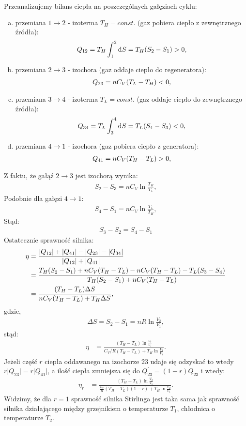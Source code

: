 \documentclass[11pt,a4paper]{article}
\begin{document}
Przeanalizujemy bilans ciepła na poszczególnych gałęziach cyklu:
\begin{enumerate}[a)]
\item przemiana $1 \rightarrow 2$ - izoterma $T_H =const.$  (gaz pobiera ciepło z zewnętrznego źródła):
\begin{align}
Q_{\rm 12} =T_H \int_1^2 {\rm d} S = T_H (S_2-S_1)>0,
\end{align}
\item przemiana $2 \rightarrow 3$ - izochora (gaz oddaje ciepło do regeneratora):
\begin{align}
Q_{\rm 23} =n C_V (T_L -T_H)<0,
\end{align}
\item przemiana $3 \rightarrow 4$ - izoterma $T_L=const.$  (gaz oddaje ciepło do zewnętrznego źródła):
\begin{align}
Q_{\rm 34} =T_L \int_3^4 {\rm d} S = T_L (S_4-S_3)<0,
\end{align}
\item przemiana $4 \rightarrow 1$ - izochora (gaz pobiera ciepło z generatora):
\begin{align}
Q_{\rm 41} =n C_V (T_H -T_L)>0,
\end{align}
\end{enumerate}
Z faktu, że gałąź $2\rightarrow 3$ jest izochorą wynika:
\begin{align}
S_2-S_3 = n C_V \ln{\frac{T_H}{T_L}},
\end{align}
Podobnie dla gałęzi $4 \rightarrow 1$:
\begin{align}
S_4-S_1 = n C_V \ln{\frac{T_L}{T_H}},
\end{align}
Stąd:
\begin{align}
S_3-S_2= S_4-S_1 
\end{align}
Ostatecznie sprawność silnika:
\begin{align}
\eta&= \frac{\lvert Q_{12}\rvert + \lvert Q_{\rm 41}\rvert - \lvert Q_{23}\rvert - \lvert Q_{34}\rvert }{\lvert Q_{12}\rvert + \lvert Q_{41}\rvert}\\
&= \frac{ T_H (S_2-S_1) + n C_V (T_H-T_L) - nC_V (T_H-T_L)-T_L(S_3-S_4)}{T_H (S_2-S_1) + n C_V (T_H-T_L) }\\
&= \frac{(T_H-T_L)\Delta S}{n C_V (T_H-T_L)+ T_H \Delta S},
\end{align}
gdzie,
\begin{align}
\Delta S = S_2 -S_1 = n R \ln{\frac{V_2}{V_1}},
\end{align}
stąd:
\begin{align}
\eta &=  \frac{(T_H-T_L)\ln{\frac{V_2}{V_1}}}{ C_V/R (T_H-T_L)+ T_H \ln{\frac{V_2}{V_1}}}.
\end{align}
Jeżeli część $r$ ciepła oddawanego na izochorze $23$ udaje się odzyskać to wtedy $r \lvert Q_{23} \rvert = r \lvert Q_{41} \rvert$,  a ilość ciepła  zmniejsza się do $Q_{23}^{\prime} = (1-r) Q_{23}$ i wtedy:
\begin{align}
\eta_r &=  \frac{(T_H-T_L)\ln{\frac{V_2}{V_1}}}{ \frac{C_V}{R} (T_H-T_L)(1-r)+ T_H \ln{\frac{V_2}{V_1}}}.
\end{align}
Widzimy, że dla $r=1$ sprawność silnika Stirlinga jest taka sama jak sprawność silnika działającego między grzejnikiem o temperaturze $T_1$,  chłodnica o temperaturze $T_2$.
\end{document}
